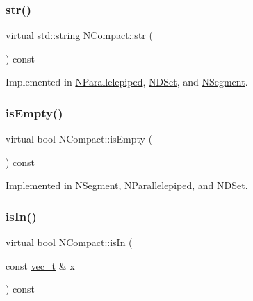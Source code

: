 \subsubsection{\texorpdfstring{str()}{str()}}
{\footnotesize\ttfamily virtual std\+::string N\+Compact\+::str (\begin{DoxyParamCaption}{ }\end{DoxyParamCaption}) const\hspace{0.3cm}{\ttfamily [pure virtual]}}



Implemented in \mbox{\hyperlink{class_n_parallelepiped_a2f5b58b9b80e9b3fda4177fb7703b221}{N\+Parallelepiped}}, \mbox{\hyperlink{class_n_d_set_ada343b5d74ced1894dfe098c6324d61e}{N\+D\+Set}}, and \mbox{\hyperlink{class_n_segment_a15514dec8420dd1aafda38e7327c9be0}{N\+Segment}}.

\mbox{\label{class_n_compact_a574764d7ac4fe2393a739b67bf57a7f1}} 
\subsubsection{\texorpdfstring{isEmpty()}{isEmpty()}}
{\footnotesize\ttfamily virtual bool N\+Compact\+::is\+Empty (\begin{DoxyParamCaption}{ }\end{DoxyParamCaption}) const\hspace{0.3cm}{\ttfamily [pure virtual]}}



Implemented in \mbox{\hyperlink{class_n_segment_ac17e9542c20477269bbcf08286d79d07}{N\+Segment}}, \mbox{\hyperlink{class_n_parallelepiped_a7c4271e0cd8678b6904b1f25d116cd57}{N\+Parallelepiped}}, and \mbox{\hyperlink{class_n_d_set_aafdebcaf09b5efa04872041e4449190c}{N\+D\+Set}}.

\mbox{\label{class_n_compact_a387e86914973c69b292782f640368680}} 
\subsubsection{\texorpdfstring{isIn()}{isIn()}}
{\footnotesize\ttfamily virtual bool N\+Compact\+::is\+In (\begin{DoxyParamCaption}\item[{const \mbox{\hyperlink{group___n_algebra_ga0a2cfc67e738a3d73e4f12098c4c07f6}{vec\+\_\+t}} \&}]{x }\end{DoxyParamCaption}) const\hspace{0.3cm}{\ttfamily [pure virtual]}}



